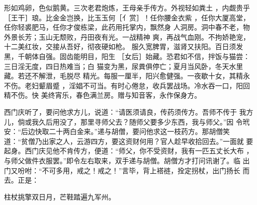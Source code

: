 形如鸡卵，色似鹅黄。三次老君炮炼，王母亲手传方。外视轻如粪土
，内觑贵乎［王干］琅。比金金岂换，比玉玉何［亻赏］！任你腰金衣紫
，任你大厦高堂，任你轻裘肥马，任你才俊栋梁，此药用托掌内，飘然身
人洞房。洞中春不老，物外景长芳；玉山无颓败，丹田夜有光。一战精神
爽，再战气血刚。不拘娇艳宠，十二美红妆，交接从吾好，彻夜硬如枪。
服久宽脾胃，滋肾又扶阳。百日须发黑，千朝体自强。固齿能明目，阳生
［女后］始藏。恐君如不信，拌饭与猫尝：三日淫无度，四日热难当；白
猫变为黑，尿粪俱停亡；夏月当风卧，冬天水里藏。若还不解泄，毛脱尽
精光。每服一厘半，阳兴愈健强。一夜歇十女，其精永不伤。老妇颦眉蹙
，淫娼不可当。有时心倦怠，收兵罢战场。冷水吞一口，阳回精不伤。快
美终宵乐，春色满兰房。赠与知音客，永作保身方。

西门庆听了，要问他求方儿，说道：“请医须请良，传药须传方。吾师不传于
我方儿，倘或我久后用没了，那里寻师父去？随师父要多少东西，我与师父。”因
令玳安：“后边快取二十两白金来。”递与胡僧，要问他求这一枝药方。那胡僧笑
道：“贫僧乃出家之人，云游四方，要这资财何用？官人趁早收拾回去。”一面就
要起身。西门庆见他不肯传方，便道：“师父，你不受资财，我有一匹五丈长大布
，与师父做件衣服罢。”即令左右取来，双手递与胡僧。胡僧方才打问讯谢了。临
出门又吩咐：“不可多用，戒之！戒之！”言毕，背上褡裢，拴定拐杖，出门扬长
而去。正是：

柱杖挑擎双日月，芒鞋踏遍九军州。